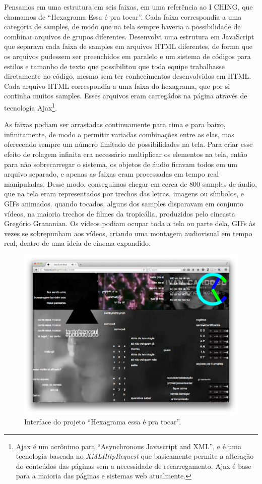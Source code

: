 Pensamos em uma estrutura em seis faixas, em uma referência ao I CHING, que chamamos de ``Hexagrama Essa é pra tocar''.  Cada faixa correspondia a uma categoria de samples, de modo que na tela sempre haveria a possibilidade de combinar arquivos de grupos diferentes. Desenvolvi uma estrutura em JavaScript que separava cada faixa de samples em arquivos HTML diferentes, de forma que os arquivos pudessem ser preenchidos em paralelo e um sistema de códigos para estilos e tamanho de texto que possibilitou que toda equipe trabalhasse diretamente no código, mesmo sem ter conhecimentos desenvolvidos em HTML. 
Cada arquivo HTML correspondia a uma faixa do hexagrama, que por si continha muitos samples. Esses arquivos eram carregádos na página através de tecnologia Ajax\footnote{Ajax é um acrônimo para ``Asynchronous Javascript and XML'', e é uma tecnologia baseada no \emph{XMLHttpRequest} que basicamente permite a alteração do conteúdos das páginas sem a necessidade de recarregamento. Ajax é base para a maioria das páginas e sistemas web atualmente.}. 

As faixas podiam ser arrastadas continuamente para cima e para baixo, infinitamente, de modo a permitir variadas combinações entre as elas, mas oferecendo sempre um número limitado de possibilidades na tela. Para criar esse efeito de rolagem infinita era necessário multiplicar os elementos na tela, então para não sobrecarregar o sistema, os objetos de áudio ficavam todos em um arquivo separado, e apenas as faixas eram processadas em tempo real manipuladas. 
Desse modo, conseguimos chegar em cerca de 800 samples de áudio, que na tela eram representados por trechos das letras, imagens ou símbolos, e GIFs animados. quando tocados, alguns dos samples disparavam em conjunto vídeos, na maioria trechos de filmes da tropicália, produzidos pelo cineasta Gregório Grananian. Os vídeos podiam ocupar toda a tela ou parte dela, GIFs às vezes se sobrepunham aos vídeos, criando uma montagem audiovisual em tempo real, dentro de uma ideia de cinema expandido.  

\begin{figure}

\includegraphics[width=1\textwidth]{pictures/cap1/gil701}
\caption{Interface do projeto ``Hexagrama essa é pra tocar''.}
\label{fig:gil701}
\end{figure}

